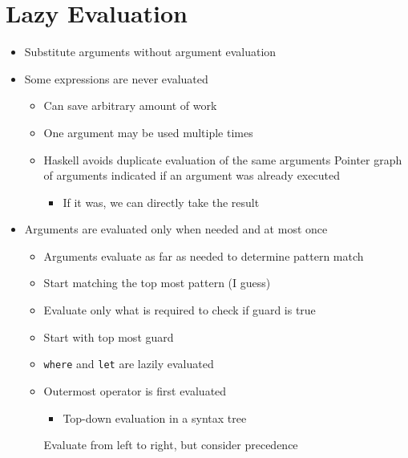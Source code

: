 
\section{Lazy Evaluation}
\begin{itemize}
    \item Substitute arguments without argument evaluation
    \item Some expressions are never evaluated
        \begin{itemize}
            \item Can save arbitrary amount of work
        \end{itemize}
        \begin{itemize}
            \item One argument may be used multiple times
            \item Haskell avoids duplicate evaluation of the same arguments
             Pointer graph of arguments indicated if an argument was already executed
                \begin{itemize}
                    \item If it was, we can directly take the result
                \end{itemize}
        \end{itemize}
    \item Arguments are evaluated only when needed and at most once
        \begin{itemize}
            \item Arguments evaluate as far as needed to determine pattern match
            \item Start matching the top most pattern (I guess)
        \end{itemize}
        \begin{itemize}
            \item Evaluate only what is required to check if guard is true
            \item Start with top most guard
        \end{itemize}
        \begin{itemize}
            \item \verb+where+ and \verb+let+ are lazily evaluated
        \end{itemize}
        \begin{itemize}
            \item Outermost operator is first evaluated
                \begin{itemize}
                    \item Top-down evaluation in a syntax tree
                \end{itemize}
             Evaluate from left to right, but consider precedence
        \end{itemize}
\end{itemize}

